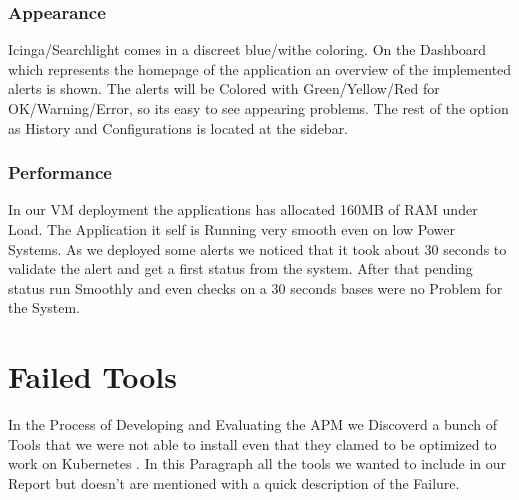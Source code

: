 \subsubsection{Appearance}
Icinga/Searchlight comes in a  discreet blue/withe coloring. On the Dashboard which represents the homepage of the application an overview of the implemented alerts is shown. The alerts will be Colored with Green/Yellow/Red for OK/Warning/Error, so its easy to see appearing problems. The rest of the option as History and Configurations is located at the sidebar. 
\subsubsection{Performance}
In our VM deployment the applications has allocated 160MB of RAM under Load. The Application it self is Running very smooth even on low Power Systems. As we deployed some alerts we noticed that it took about 30 seconds to validate the alert and get a first status from the system. After that pending status run Smoothly and even checks on a 30 seconds bases were no Problem for the System.




\section{Failed Tools}%
In the Process of Developing and Evaluating the APM we Discoverd a bunch of Tools that we were not able to install even that they clamed to be optimized to work on Kubernetes .
In this Paragraph all the tools we wanted to include in our Report but doesn't are mentioned with a quick description of the Failure.
